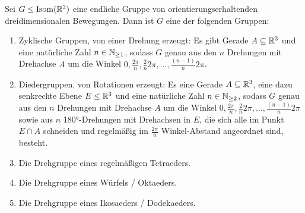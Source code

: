 \begin{theorem}
Sei $G\leq\operatorname{Isom}(\mathbb{R}^3)$ eine endliche Gruppe von orientierungserhaltenden dreidimensionalen Bewegungen. Dann ist $G$ eine der folgenden Gruppen:

\begin{enumerate}
\item Zyklische Gruppen, von einer Drehung erzeugt: Es gibt Gerade $A\subseteq\mathbb{R}^3$ und eine natürliche Zahl $n\in\mathbb{N}_{\geq 1}$, sodass $G$ genau aus den $n$ Drehungen mit Drehachse $A$ um die Winkel $0,\frac{2\pi}{n}, \frac{2}{n}2\pi, \ldots, \frac{(n-1)}{n}2\pi$.

\item Diedergruppen, von Rotationen erzeugt: Es eine Gerade $A\subseteq\mathbb{R}^3$, eine dazu senkrechte Ebene $E\leq\mathbb{R}^3$ und eine natürliche Zahl $n\in\mathbb{N}_{\geq 2}$, sodass $G$ genau aus den $n$ Drehungen mit Drehachse $A$ um die Winkel $0,\frac{2\pi}{n}, \frac{2}{n}2\pi, \ldots, \frac{(n-1)}{n}2\pi$ sowie aus $n$ 180°-Drehungen mit Drehachsen in $E$, die sich alle im Punkt $E\cap A$ schneiden und regelmäßig im $\frac{2\pi}{n}$ Winkel-Abstand angeordnet sind, besteht.

\item Die Drehgruppe eines regelmäßigen Tetraeders.

\item Die Drehgruppe eines Würfels / Oktaeders.

\item Die Drehgruppe eines Ikosaeders / Dodekaeders.
\end{enumerate}

\end{theorem}
